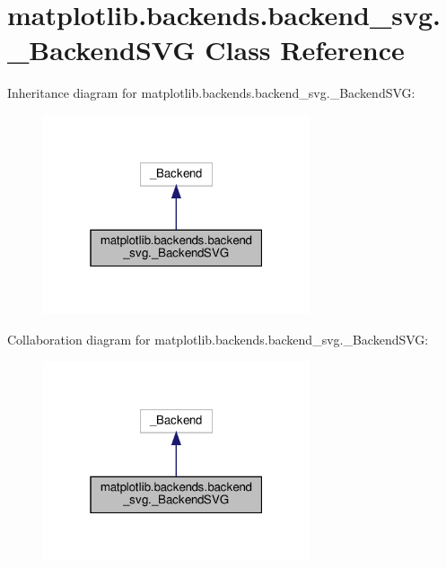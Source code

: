 \hypertarget{classmatplotlib_1_1backends_1_1backend__svg_1_1__BackendSVG}{}\section{matplotlib.\+backends.\+backend\+\_\+svg.\+\_\+\+Backend\+S\+VG Class Reference}
\label{classmatplotlib_1_1backends_1_1backend__svg_1_1__BackendSVG}


Inheritance diagram for matplotlib.\+backends.\+backend\+\_\+svg.\+\_\+\+Backend\+S\+VG\+:
\nopagebreak
\begin{figure}[H]
\begin{center}
\leavevmode
\includegraphics[width=223pt]{classmatplotlib_1_1backends_1_1backend__svg_1_1__BackendSVG__inherit__graph}
\end{center}
\end{figure}


Collaboration diagram for matplotlib.\+backends.\+backend\+\_\+svg.\+\_\+\+Backend\+S\+VG\+:
\nopagebreak
\begin{figure}[H]
\begin{center}
\leavevmode
\includegraphics[width=223pt]{classmatplotlib_1_1backends_1_1backend__svg_1_1__BackendSVG__coll__graph}
\end{center}
\end{figure}
